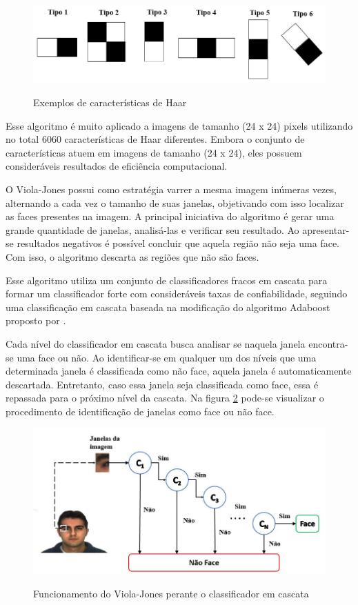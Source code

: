 \begin{figure}[H]
\centering
\caption{Exemplos de características de Haar }
\includegraphics[scale = 0.58]{imgs/viola3.png}
\label{fig:viola2}
\end{figure}

Esse algoritmo é muito aplicado a imagens de tamanho (24 x 24) pixels utilizando no total 6060 características de Haar diferentes. Embora o conjunto de características atuem em imagens de tamanho (24 x 24), eles possuem consideráveis resultados de eficiência computacional.

O Viola-Jones possui como estratégia varrer a mesma imagem inúmeras vezes, alternando a cada vez o tamanho de suas janelas, objetivando com isso localizar as faces presentes na imagem. A principal iniciativa do algoritmo é  gerar uma grande quantidade de janelas, analisá-las e verificar seu resultado. Ao apresentar-se resultados negativos é possível concluir que aquela região não seja uma face. Com isso, o algoritmo descarta as regiões que não são faces.

Esse algoritmo utiliza um conjunto de classificadores fracos em cascata para formar um classificador forte com consideráveis taxas de confiabilidade, seguindo uma classificação em cascata baseada na modificação do algoritmo Adaboost proposto por .

Cada nível do classificador em cascata busca analisar se naquela janela encontra-se uma face ou não. Ao identificar-se em qualquer um dos níveis que uma determinada janela é classificada como não face, aquela janela é automaticamente descartada. Entretanto, caso essa janela seja classificada como face, essa é repassada para o próximo nível da cascata. Na figura \ref{fig:viola5} pode-se visualizar o procedimento de identificação de janelas como face ou não face.

\begin{figure}[H]
\centering
\caption{Funcionamento do Viola-Jones perante o classificador em cascata }
\includegraphics[scale = 0.7]{imgs/viola6.jpg}
\label{fig:viola5}
\end{figure}

